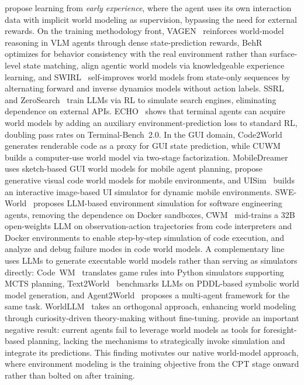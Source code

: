 \documentclass{llmxive}
\begin{document}
\citet{zhang2025agent} propose learning from \emph{early experience}, where the agent uses its own interaction data with implicit world modeling as supervision, bypassing the need for external rewards.
On the training methodology front, VAGEN~\citep{wang2026vagen} reinforces world-model reasoning in VLM agents through dense state-prediction rewards, BehR~\citep{huang2026beyond} optimizes for behavior consistency with the real environment rather than surface-level state matching, \citet{ren2026aligning} align agentic world models via knowledgeable experience learning, and SWIRL~\citep{qiu2026self} self-improves world models from state-only sequences by alternating forward and inverse dynamics models without action labels.
SSRL~\citep{fan2025ssrl} and ZeroSearch~\citep{sun2025zerosearch} train LLMs via RL to simulate search engines, eliminating dependence on external APIs.
ECHO~\citep{shrivastava2026echo} shows that terminal agents can acquire world models by adding an auxiliary environment-prediction loss to standard RL, doubling pass rates on Terminal-Bench~2.0.
In the GUI domain, Code2World~\citep{zheng2026code2world} generates renderable code as a proxy for GUI state prediction, while CUWM~\citep{guan2026computer} builds a computer-use world model via two-stage factorization.
MobileDreamer~\citep{cao2026mobiledreamer} uses sketch-based GUI world models for mobile agent planning, \citet{koh2026generative} propose generative visual code world models for mobile environments, and UISim~\citep{xiang2025uisim} builds an interactive image-based UI simulator for dynamic mobile environments.
SWE-World~\citep{sun2026swe} proposes LLM-based environment simulation for software engineering agents, removing the dependence on Docker sandboxes, CWM~\citep{copet2025cwm} mid-trains a 32B open-weights LLM on observation-action trajectories from code interpreters and Docker environments to enable step-by-step simulation of code execution, and \citet{rahmani2026debugging} analyze and debug failure modes in code world models.
A complementary line uses LLMs to generate executable world models rather than serving as simulators directly: Code~WM~\citep{lehrach2025code} translates game rules into Python simulators supporting MCTS planning, Text2World~\citep{hu2025text2world} benchmarks LLMs on PDDL-based symbolic world model generation, and Agent2World~\citep{hu2025agent2world} proposes a multi-agent framework for the same task.
WorldLLM~\citep{levy2025worldllm} takes an orthogonal approach, enhancing world modeling through curiosity-driven theory-making without fine-tuning.
\citet{qian2026current} provide an important negative result: current agents fail to leverage world models as tools for foresight-based planning, lacking the mechanisms to strategically invoke simulation and integrate its predictions.
This finding motivates our native world-model approach, where environment modeling is the training objective from the CPT stage onward rather than bolted on after training.
\end{document}

